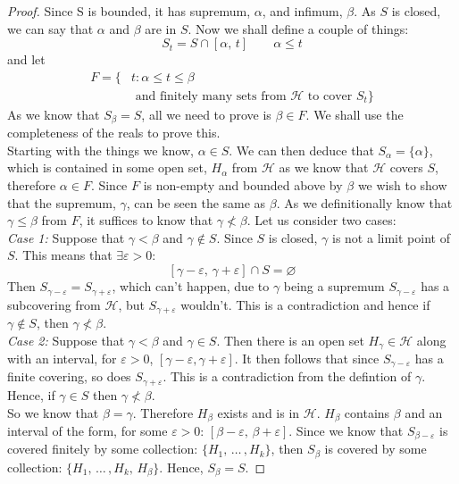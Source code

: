 \documentclass{article}
\renewcommand{\a}{\alpha}
\renewcommand{\b}{\beta}
\newcommand{\g}{\gamma}
\newcommand{\e}{\varepsilon}
\newcommand{\ex}{\exists}
\begin{document}
\begin{proof}
  Since S is bounded, it has supremum, $\a$, and infimum, $\b$. As $S$ is closed, we can say that $\a$ and $\b$ are in $S$. Now we shall define a couple of things:
  $$ S_t = S \cap [\a,\, t] \qquad \a \le t $$
  and let
  \begin{align*}
    F = \{ &t : \a \le t \le \b \\
    &\text{ and finitely many sets from $\mathcal{H}$ to cover $S_t$} \}
  \end{align*}
  As we know that $\displaystyle{S_\b = S}$, all we need to prove is $\displaystyle{\b \in F}$. We shall use the completeness of the reals to prove this.\\

  \noindent
  Starting with the things we know, $\displaystyle{\a \in S}$. We can then deduce that $\displaystyle{S_\a = \{ \a \}}$, which is contained in some open set, $H_\a$ from $\mathcal{H}$ as we know that $\mathcal{H}$ covers $S$, therefore $\a \in F$. Since $F$ is non-empty and bounded above by $\b$ we wish to show that the supremum, $\g$, can be seen the same as $\b$. As we definitionally know that $\g \le \b$ from $F$, it suffices to know that $\g \nless \b$. Let us consider two cases:\\

  \noindent
  \emph{Case 1:} Suppose that $\g < \b$ and $\g \notin S$. Since $S$ is closed, $\g$ is not a limit point of $S$. This means that $\ex \e > 0:$
  $$ [\g - \e,\, \g + \e] \cap S = \varnothing $$
  Then $S_{\g - \e} = S_{\g + \e}$, which can't happen, due to $\g$ being a supremum $S_{\g - \e}$ has a subcovering from $\mathcal{H}$, but $S_{\g + \e}$ wouldn't. This is a contradiction and hence if $\g \notin S$, then $\g \nless \b$.\\

  \noindent
  \emph{Case 2:} Suppose that $\g < \b$ and $\g \in S$. Then there is an open set $H_\g \in \mathcal{H}$ along with an interval, for $\e > 0$, $[\g - \e, \g + \e]$. It then follows that since $S_{\g - \e}$ has a finite covering, so does $S_{\g + \e}$. This is a contradiction from the defintion of $\g$. Hence, if $\g \in S$ then $\g \nless \b$.\\

  \noindent
  So we know that $\b = \g$. Therefore $H_\b$ exists and is in $\mathcal{H}$. $H_\b$ contains $\b$ and an interval of the form, for some $\e > 0$: $[\b - \e,\, \b + \e]$. Since we know that $S_{\b - \e}$ is covered finitely by some collection: $\{ H_1,\, \dots\,, H_k \}$, then $S_\b$ is covered by some collection: $\{ H_1,\, \dots\,, H_k,\, H_\b \}$. Hence, $S_\b = S$.
\end{proof}
\end{document}

